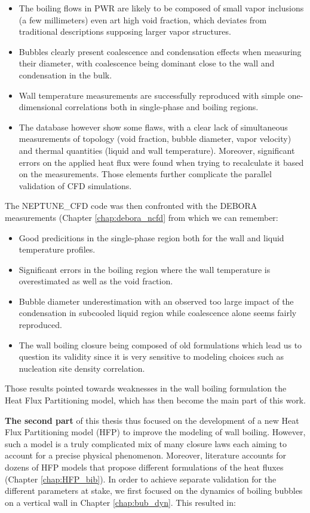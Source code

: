 \begin{itemize}
\item The boiling flows in PWR are likely to be composed of small vapor inclusions (a few millimeters) even art high void fraction, which deviates from traditional descriptions supposing larger vapor structures.
\item Bubbles clearly present coalescence and condensation effects when measuring their diameter, with coalescence being dominant close to the wall and condensation in the bulk.
\item Wall temperature measurements are successfully reproduced with simple one-dimensional correlations both in single-phase and boiling regions.
\item The database however show some flaws, with a clear lack of simultaneous measurements of topology (void fraction, bubble diameter, vapor velocity) and thermal quantities (liquid and wall temperature). Moreover, significant errors on the applied heat flux were found when trying to recalculate it based on the measurements. Those elements further complicate the parallel validation of CFD simulations. 
\end{itemize}

The NEPTUNE\_CFD code was then confronted with the DEBORA measurements (Chapter \ref{chap:debora_ncfd} from which we can remember:

\begin{itemize}
\item Good predicitions in the single-phase region both for the wall and liquid temperature profiles.
\item Significant errors in the boiling region where the wall temperature is overestimated as well as the void fraction.
\item Bubble diameter underestimation with an observed too large impact of the condensation in subcooled liquid region while coalescence alone seems fairly reproduced.
\item The wall boiling closure being composed of old formulations which lead us to question its validity since it is very sensitive to modeling choices such as nucleation site density correlation. 
\end{itemize}

Those results pointed towards weaknesses in the wall boiling formulation \ie the Heat Flux Partitioning model, which has then become the main part of this work.

\npar

\textbf{The second part} of this thesis thus focused on the development of a new Heat Flux Partitioning model (HFP) to improve the modeling of wall boiling. However, such a model is a truly complicated mix of many closure laws each aiming to account for a precise physical phenomenon. Moreover, literature accounts for dozens of HFP models that propose different formulations of the heat fluxes (Chapter \ref{chap:HFP_bib}). In order to achieve separate validation for the different parameters at stake, we first focused on the dynamics of boiling bubbles on a vertical wall in Chapter \ref{chap:bub_dyn}. This resulted in:


